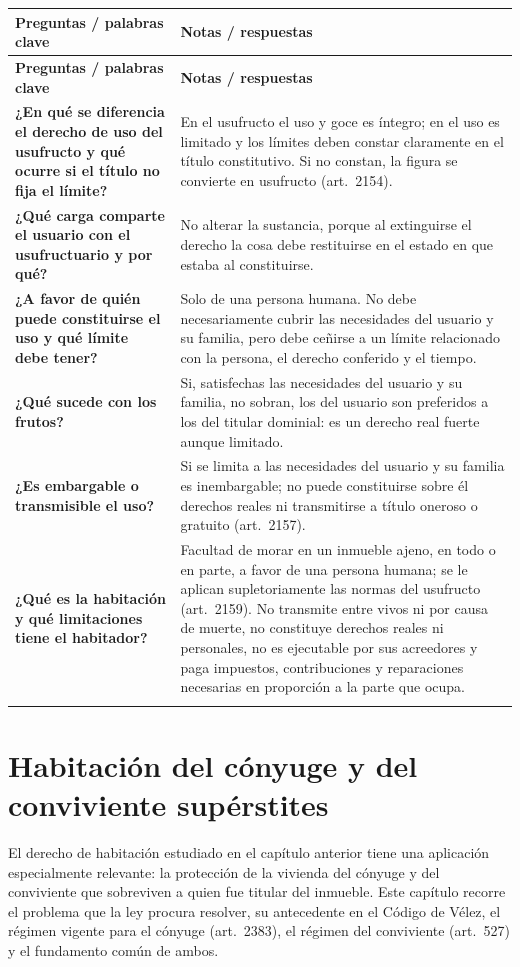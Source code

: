 \documentclass[12pt,oneside]{book}
\makeatletter
\renewcommand{\arraystretch}{1.25}
\newcommand{\cq}[2]{\textbf{#1} & #2 \\[0.45em]}
\newcommand{\cornell}[3]{%
\par\bigskip\noindent{\large\bfseries Cuadro Cornell: #1}\par\nopagebreak\smallskip
\begingroup
\small
\renewcommand{\arraystretch}{1.15}
\begin{longtable}{@{}>{\raggedright\arraybackslash}p{0.26\textwidth}>{\raggedright\arraybackslash}p{0.66\textwidth}@{}}
\toprule
\textbf{Preguntas / palabras clave} & \textbf{Notas / respuestas} \\
\midrule
\endfirsthead
\toprule
\textbf{Preguntas / palabras clave} & \textbf{Notas / respuestas} \\
\midrule
\endhead
#2
\midrule
\multicolumn{2}{@{}p{\dimexpr0.92\textwidth+2\tabcolsep\relax}@{}}{\vspace{0.2em}\textbf{Resumen.} #3\vspace{0.2em}} \\
\bottomrule
\end{longtable}
\endgroup
}
\makeatother
\begin{document}
\cornell{uso y habitación}{
\cq{¿En qué se diferencia el derecho de uso del usufructo y qué ocurre si el título no fija el límite?}{En el usufructo el uso y goce es íntegro; en el uso es limitado y los límites deben constar claramente en el título constitutivo. Si no constan, la figura se convierte en usufructo (art.~2154).}
\cq{¿Qué carga comparte el usuario con el usufructuario y por qué?}{No alterar la sustancia, porque al extinguirse el derecho la cosa debe restituirse en el estado en que estaba al constituirse.}
\cq{¿A favor de quién puede constituirse el uso y qué límite debe tener?}{Solo de una persona humana. No debe necesariamente cubrir las necesidades del usuario y su familia, pero debe ceñirse a un límite relacionado con la persona, el derecho conferido y el tiempo.}
\cq{¿Qué sucede con los frutos?}{Si, satisfechas las necesidades del usuario y su familia, no sobran, los del usuario son preferidos a los del titular dominial: es un derecho real fuerte aunque limitado.}
\cq{¿Es embargable o transmisible el uso?}{Si se limita a las necesidades del usuario y su familia es inembargable; no puede constituirse sobre él derechos reales ni transmitirse a título oneroso o gratuito (art.~2157).}
\cq{¿Qué es la habitación y qué limitaciones tiene el habitador?}{Facultad de morar en un inmueble ajeno, en todo o en parte, a favor de una persona humana; se le aplican supletoriamente las normas del usufructo (art.~2159). No transmite entre vivos ni por causa de muerte, no constituye derechos reales ni personales, no es ejecutable por sus acreedores y paga impuestos, contribuciones y reparaciones necesarias en proporción a la parte que ocupa.}
}{El uso es un derecho de usar y gozar de cosa ajena de manera limitada; el límite debe constar en el título, pues de lo contrario la figura se convierte en usufructo. Se constituye a favor de personas humanas, no es transmisible y, si se limita a las necesidades del usuario y su familia, es inembargable. La habitación otorga la facultad de morar en un inmueble ajeno, en todo o en parte, con limitaciones de transmisión, constitución de derechos y ejecución, y con obligación de afrontar gastos en proporción a la parte ocupada.}

\chapter{Habitación del cónyuge y del conviviente supérstites}\label{cap:habsuperstite}

El derecho de habitación estudiado en el capítulo anterior tiene una aplicación especialmente relevante: la protección de la vivienda del cónyuge y del conviviente que sobreviven a quien fue titular del inmueble. Este capítulo recorre el problema que la ley procura resolver, su antecedente en el Código de Vélez, el régimen vigente para el cónyuge (art.~2383), el régimen del conviviente (art.~527) y el fundamento común de ambos.
\end{document}
